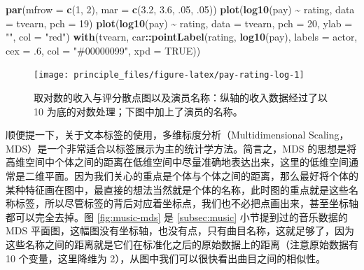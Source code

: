 \documentclass[
  b5paper,
  UTF8,twoside]{book}
\newenvironment{Shaded}{\begin{snugshade}}{\end{snugshade}}
\newcommand{\AttributeTok}[1]{\textcolor[rgb]{0.13,0.29,0.53}{#1}}
\newcommand{\ConstantTok}[1]{\textcolor[rgb]{0.56,0.35,0.01}{#1}}
\newcommand{\DecValTok}[1]{\textcolor[rgb]{0.00,0.00,0.81}{#1}}
\newcommand{\FloatTok}[1]{\textcolor[rgb]{0.00,0.00,0.81}{#1}}
\newcommand{\FunctionTok}[1]{\textcolor[rgb]{0.13,0.29,0.53}{\textbf{#1}}}
\newcommand{\NormalTok}[1]{#1}
\newcommand{\SpecialCharTok}[1]{\textcolor[rgb]{0.81,0.36,0.00}{\textbf{#1}}}
\newcommand{\StringTok}[1]{\textcolor[rgb]{0.31,0.60,0.02}{#1}}
\begin{document}
\begin{Shaded}
\begin{Highlighting}[]
\FunctionTok{par}\NormalTok{(}\AttributeTok{mfrow =} \FunctionTok{c}\NormalTok{(}\DecValTok{1}\NormalTok{, }\DecValTok{2}\NormalTok{), }\AttributeTok{mar =} \FunctionTok{c}\NormalTok{(}\FloatTok{3.2}\NormalTok{, }\FloatTok{3.6}\NormalTok{, .}\DecValTok{05}\NormalTok{, .}\DecValTok{05}\NormalTok{))}
\FunctionTok{plot}\NormalTok{(}\FunctionTok{log10}\NormalTok{(pay) }\SpecialCharTok{\textasciitilde{}}\NormalTok{ rating, }\AttributeTok{data =}\NormalTok{ tvearn, }\AttributeTok{pch =} \DecValTok{19}\NormalTok{)}
\FunctionTok{plot}\NormalTok{(}\FunctionTok{log10}\NormalTok{(pay) }\SpecialCharTok{\textasciitilde{}}\NormalTok{ rating, }\AttributeTok{data =}\NormalTok{ tvearn, }\AttributeTok{pch =} \DecValTok{20}\NormalTok{, }\AttributeTok{ylab =} \StringTok{""}\NormalTok{, }\AttributeTok{col =} \StringTok{"red"}\NormalTok{)}
\FunctionTok{with}\NormalTok{(tvearn, car}\SpecialCharTok{::}\FunctionTok{pointLabel}\NormalTok{(rating, }\FunctionTok{log10}\NormalTok{(pay), }\AttributeTok{labels =}\NormalTok{ actor, }
                        \AttributeTok{cex =}\NormalTok{ .}\DecValTok{6}\NormalTok{, }\AttributeTok{col =} \StringTok{"\#00000099"}\NormalTok{, }\AttributeTok{xpd =} \ConstantTok{TRUE}\NormalTok{))}
\end{Highlighting}
\end{Shaded}

\begin{figure}

{\centering \texttt{[image: principle\_files/figure-latex/pay-rating-log-1]} 

}

\caption[ 取对数的收入与评分散点图以及演员名称 ]{取对数的收入与评分散点图以及演员名称：纵轴的收入数据经过了以 10 为底的对数处理；下图中加上了演员的名称。}\label{fig:pay-rating-log}
\end{figure}



顺便提一下，关于文本标签的使用，多维标度分析（Multidimensional Scaling，MDS）是一个非常适合以标签展示为主的统计学方法。简言之，MDS 的思想是将高维空间中个体之间的距离在低维空间中尽量准确地表达出来，这里的低维空间通常是二维平面。因为我们关心的重点是个体与个体之间的距离，那么最好将个体的某种特征画在图中，最直接的想法当然就是个体的名称，此时图的重点就是这些名称标签，所以尽管标签的背后对应着坐标点，我们也不必把点画出来，甚至坐标轴都可以完全去掉。图 \ref{fig:music-mds} 是 \ref{subsec:music} 小节提到过的音乐数据的 MDS 平面图，这幅图没有坐标轴，也没有点，只有曲目名称，这就足够了，因为这些名称之间的距离就是它们在标准化之后的原始数据上的距离（注意原始数据有 10 个变量，这里降维为 2），从图中我们可以很快看出曲目之间的相似性。
\end{document}

